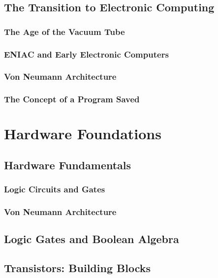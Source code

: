 \documentclass[12pt, oneside]{book}
\begin{document}
	\section{The Transition to Electronic Computing}
	
	\subsection{The Age of the Vacuum Tube}
	
	\subsection{ENIAC and Early Electronic Computers}
	
	\subsection{Von Neumann Architecture}
	
	\subsection{The Concept of a Program Saved}
	
	\chapter{Hardware Foundations}
	\section{Hardware Fundamentals}
	
	\subsection{Logic Circuits and Gates}
	
	\subsection{Von Neumann Architecture}
	
	\section{Logic Gates and Boolean Algebra}
	
	\section{Transistors: Building Blocks}
	
\end{document}
